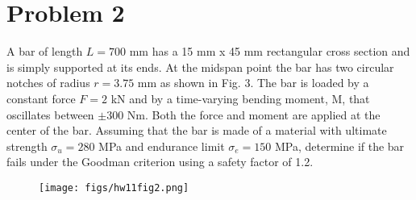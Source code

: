 \documentclass[12 pt]{article}
\begin{document}
\pagebreak
\section*{Problem 2}
A bar of length $L = 700$ mm has a 15 mm x 45 mm rectangular cross section and is simply
supported at its ends. At the midspan point the bar has two circular notches of radius $r =3.75$ mm
as shown in Fig. 3. The bar is loaded by a constant force $F = 2$ kN and by a time-varying bending
moment, M, that oscillates between $\pm 300$ Nm. Both the force and moment are applied at the
center of the bar. Assuming that the bar is made of a material with ultimate strength $\sigma_u = 280$ MPa
and endurance limit $\sigma_e = 150$ MPa, determine if the bar fails under the Goodman criterion using a
safety factor of 1.2.
\begin{figure}[H]
    \centering
    \texttt{[image: figs/hw11fig2.png]}
\end{figure}

\pagebreak
\end{document}
